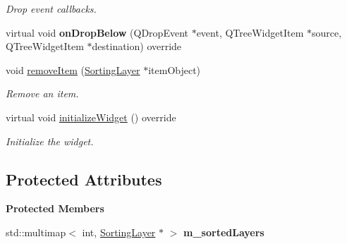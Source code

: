 \begin{Indent}
\begin{DoxyCompactItemize}
\begin{DoxyCompactList}\small\item\em Drop event callbacks. \end{DoxyCompactList}\item 
\mbox{\label{classrev_1_1_view_1_1_render_layer_tree_widget_a70dc32e91ad5cc645118f4e9c6fe9480}} 
virtual void {\bfseries on\+Drop\+Below} (Q\+Drop\+Event $\ast$event, Q\+Tree\+Widget\+Item $\ast$source, Q\+Tree\+Widget\+Item $\ast$destination) override
\item 
\mbox{\label{classrev_1_1_view_1_1_render_layer_tree_widget_ac297f0b95d40f117c22dfb027cf517ae}} 
void \mbox{\hyperlink{classrev_1_1_view_1_1_render_layer_tree_widget_ac297f0b95d40f117c22dfb027cf517ae}{remove\+Item}} (\mbox{\hyperlink{structrev_1_1_sorting_layer}{Sorting\+Layer}} $\ast$item\+Object)
\begin{DoxyCompactList}\small\item\em Remove an item. \end{DoxyCompactList}\item 
\mbox{\label{classrev_1_1_view_1_1_render_layer_tree_widget_ab99c6390f85ebe8740d7785e4549dcd1}} 
virtual void \mbox{\hyperlink{classrev_1_1_view_1_1_render_layer_tree_widget_ab99c6390f85ebe8740d7785e4549dcd1}{initialize\+Widget}} () override
\begin{DoxyCompactList}\small\item\em Initialize the widget. \end{DoxyCompactList}\end{DoxyCompactItemize}
\end{Indent}
\subsection*{Protected Attributes}
\begin{Indent}\textbf{ Protected Members}\par
\begin{DoxyCompactItemize}
\item 
\mbox{\label{classrev_1_1_view_1_1_render_layer_tree_widget_af853dd2a296681d7f513f1a6bae7774b}} 
std\+::multimap$<$ int, \mbox{\hyperlink{structrev_1_1_sorting_layer}{Sorting\+Layer}} $\ast$ $>$ {\bfseries m\+\_\+sorted\+Layers}
\end{DoxyCompactItemize}
\end{Indent}
